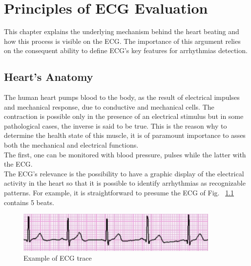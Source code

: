 \documentclass[LaM,binding=0.6cm]{sapthesis}
\begin{document}
\chapter{Principles of ECG Evaluation}
This chapter explains the underlying mechanism behind the heart beating and how this process is visible on the ECG. The importance of this argument relies on the consequent ability to define ECG's key features for arrhythmias detection.

\section{Heart's Anatomy }

The human heart pumps blood to the body, as the result of electrical impulses and mechanical response, due to conductive and mechanical cells. The contraction is possible only in the presence of an electrical stimulus but in some pathological cases, the inverse is said to be true. This is the reason why to determine the health state of this muscle, it is of paramount importance to asses both the mechanical and electrical functions.\\The first, one can be monitored with blood pressure, pulses while the latter with the ECG.\\The ECG's relevance is the possibility to have a graphic display of the electrical activity in the heart so that it is possible to identify arrhythmias as recognizable patterns. For example, it is straightforward to presume the ECG of Fig. ~\ref{fig:ecgex} contains 5 beats.
\begin{figure}[H] \centering
    \includegraphics[width=100mm,scale=0.7]{ecgtrace}
    \caption{Example of ECG trace}
    \label{fig:ecgex}
\end{figure}
\end{document}
